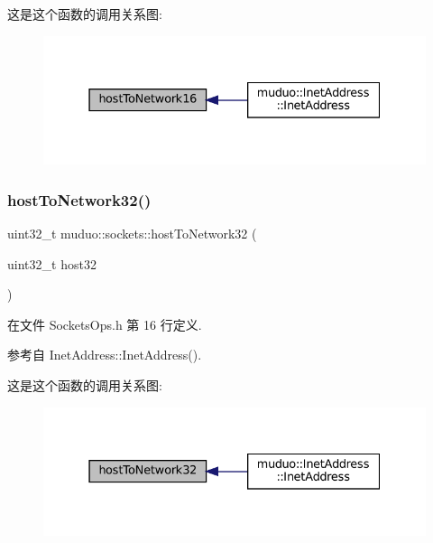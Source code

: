 这是这个函数的调用关系图\+:
\nopagebreak
\begin{figure}[H]
\begin{center}
\leavevmode
\includegraphics[width=331pt]{namespacemuduo_1_1sockets_a2c7a9f8e753e01c481aaf287251fa18e_icgraph}
\end{center}
\end{figure}
\mbox{\label{namespacemuduo_1_1sockets_a937a8685473c938d339f02a8c6d395b6}} 
\subsubsection{\texorpdfstring{host\+To\+Network32()}{hostToNetwork32()}}
{\footnotesize\ttfamily uint32\+\_\+t muduo\+::sockets\+::host\+To\+Network32 (\begin{DoxyParamCaption}\item[{uint32\+\_\+t}]{host32 }\end{DoxyParamCaption})\hspace{0.3cm}{\ttfamily [inline]}}



在文件 Sockets\+Ops.\+h 第 16 行定义.



参考自 Inet\+Address\+::\+Inet\+Address().

这是这个函数的调用关系图\+:
\nopagebreak
\begin{figure}[H]
\begin{center}
\leavevmode
\includegraphics[width=331pt]{namespacemuduo_1_1sockets_a937a8685473c938d339f02a8c6d395b6_icgraph}
\end{center}
\end{figure}
\mbox{\label{namespacemuduo_1_1sockets_a6cf7699b950ed4dfbc170a6ff9f71450}} 
